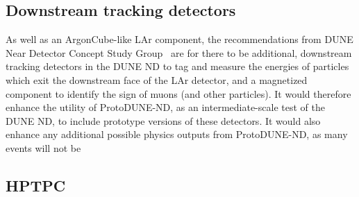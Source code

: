 \subsection{Downstream tracking detectors}
\label{sec:tracking_detectors}
As well as an ArgonCube-like LAr component, the recommendations from DUNE Near Detector Concept Study Group~\cite{dune_ndcsg} are for there to be additional, downstream tracking detectors in the DUNE ND to tag and measure the energies of particles which exit the downstream face of the LAr detector, and a magnetized component to identify the sign of muons (and other particles). It would therefore enhance the utility of ProtoDUNE-ND, as an intermediate-scale test of the DUNE ND, to include prototype versions of these detectors. It would also enhance any additional possible physics outputs from ProtoDUNE-ND, as many events will not be 

\label{sec:3dst-design}

\subsection{HPTPC}
\label{sec:hptpc-design}


